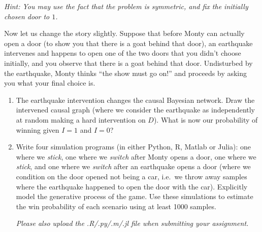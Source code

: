 \begin{enumerate}[label=7.\arabic*]
\begin{enumerate}
        \emph{Hint: You may use the fact that the problem is symmetric, and fix the initially chosen door to $1$.}
    \end{enumerate}
    Now let us change the story slightly. Suppose that before Monty can actually open a door (to show you that there is a goat behind that door), an earthquake intervenes and happens to open one of the two doors that you didn't choose initially, and you observe that there is a goat behind that door. Undisturbed by the earthquake, Monty thinks ``the show must go on!'' and proceeds by asking you what your final choice is.
    \begin{enumerate}[resume*]
        \item The earthquake intervention changes the causal Bayesian network. Draw the intervened causal graph (where we consider the earthquake as independently at random making a hard intervention on $D$).
        What is now our probability of winning given $I=1$ and $I=0$?
        \item Write four simulation programs (in either Python, R, Matlab or Julia): one where we \emph{stick}, one where we \emph{switch} after Monty opens a door, one where we \emph{stick}, and one where we \emph{switch} after an earthquake opens a door (where we condition on the door opened not being a car, i.e.\ we throw away samples where the earthquake happened to open the door with the car).
        Explicitly model the generative process of the game. Use these simulations to estimate the win probability of each scenario using at least 1000 samples.

        \emph{Please also upload the .R/.py/.m/.jl file when submitting your assignment.}
    \end{enumerate}


\end{enumerate}
